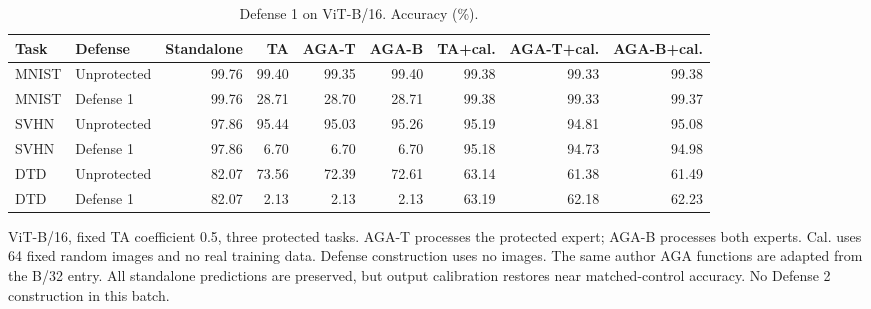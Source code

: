 \begin{table}[t]
\centering\small
\setlength{\tabcolsep}{4pt}
\caption{Defense 1 on ViT-B/16. Accuracy (\%).}
\label{tab:summary}
\begin{tabular}{@{}llrrrrrrr@{}}
\toprule
Task & Defense & Standalone & TA & AGA-T & AGA-B & TA+cal. & AGA-T+cal. & AGA-B+cal. \\
\midrule
MNIST & Unprotected & 99.76 & 99.40 & 99.35 & 99.40 & 99.38 & 99.33 & 99.38 \\
MNIST & Defense 1 & 99.76 & 28.71 & 28.70 & 28.71 & 99.38 & 99.33 & 99.37 \\
\midrule
SVHN & Unprotected & 97.86 & 95.44 & 95.03 & 95.26 & 95.19 & 94.81 & 95.08 \\
SVHN & Defense 1 & 97.86 & 6.70 & 6.70 & 6.70 & 95.18 & 94.73 & 94.98 \\
\midrule
DTD & Unprotected & 82.07 & 73.56 & 72.39 & 72.61 & 63.14 & 61.38 & 61.49 \\
DTD & Defense 1 & 82.07 & 2.13 & 2.13 & 2.13 & 63.19 & 62.18 & 62.23 \\
\bottomrule
\end{tabular}
\par\smallskip
\begin{minipage}{\textwidth}\footnotesize ViT-B/16, fixed TA coefficient 0.5, three protected tasks. AGA-T processes the protected expert; AGA-B processes both experts. Cal. uses 64 fixed random images and no real training data. Defense construction uses no images. The same author AGA functions are adapted from the B/32 entry. All standalone predictions are preserved, but output calibration restores near matched-control accuracy. No Defense 2 construction in this batch.\end{minipage}
\end{table}
